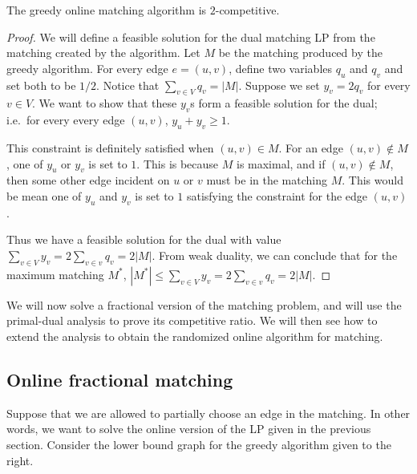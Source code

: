 \begin{theorem}
  The greedy online matching algorithm is $2$-competitive.
  \label{thm:greedy-pd}
\end{theorem}
\begin{proof}
  We will define a feasible solution for the dual matching LP from the matching
  created by the algorithm. Let $M$ be the matching produced by the greedy
  algorithm. For every edge $e = (u,v)$, define two variables $q_u$ and $q_v$
  and set both to be $1/2$. Notice that $\sum_{v\in V} q_v = |M|$. Suppose we
  set $y_v = 2q_v$ for every $v\in V$. We want to show that these $y_v$s form a
  feasible solution for the dual; i.e.\ for every every edge $(u,v)$,
  $y_u + y_v \geq 1$.

  This constraint is definitely satisfied when $(u,v)\in M$. For an edge
  $(u,v)\notin M$, one of $y_u$ or $y_v$ is set to $1$. This is because $M$ is
  maximal, and if $(u,v)\notin M$, then some other edge incident on $u$ or $v$
  must be in the matching $M$. This would be mean one of $y_u$ and $y_v$ is set
  to $1$ satisfying the constraint for the edge $(u,v)$.

  Thus we have a feasible solution for the dual with value $\sum_{v\in V} y_v = 2\sum_{v\in v} q_v = 2|M|$. From weak duality, we can conclude that for the maximum matching $M^*$, $|M^*| \leq \sum_{v\in V} y_v = 2\sum_{v\in v} q_v = 2|M|$.
\end{proof}

We will now solve a fractional version of the matching problem, and will use the
primal-dual analysis to prove its competitive ratio. We will then see how to
extend the analysis to obtain the randomized online algorithm for matching.

\subsection{Online fractional matching}

Suppose that we are allowed to partially choose an edge in the matching. In
other words, we want to solve the online version of the LP given in the previous
section. Consider the lower bound graph for the greedy algorithm given to the right.

